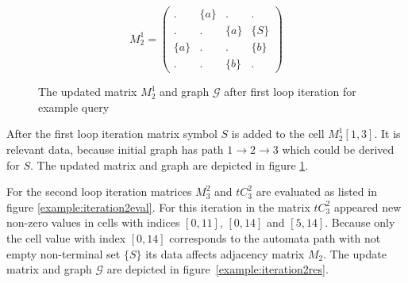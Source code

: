 \begin{figure}[h]
    \begin{subfigure}[]{0.5\textwidth}
    \centering
    $$
    M_2^1 =
    \begin{pmatrix}
    . & \{a\} & . & .     \\
    . & . & \{a\} & \{S\} \\
    \{a\} & . & . & \{b\} \\
    . & . & \{b\} & . 
    \end{pmatrix}
    $$
    \end{subfigure}
    \begin{subfigure}[]{0.4\textwidth}
    \centering
    \end{subfigure}
    \caption{The updated matrix $M_2^1$ and graph $\mathcal{G}$ after first loop iteration for example query}
    \label{example:iteration1res}
\end{figure}

After the first loop iteration matrix symbol $S$ is added to the cell $M_2^1[1,3]$. It is relevant data, because initial graph has path $1 \to 2 \to 3$ which could be derived for $S$. The updated matrix and graph are depicted in figure \ref{example:iteration1res}.

For the second loop iteration matrices $M_3^2$ and $tC_3^2$ are evaluated as listed in figure \ref{example:iteration2eval}. For this iteration in the matrix $tC_3^2$ appeared new non-zero values in cells with indices $[0,11]$, $[0,14]$ and $[5,14]$. Because only the cell value with index $[0,14]$ corresponds to the automata path with not empty non-terminal set $\{S\}$
its data affects adjacency matrix $M_2$. The update matrix and graph $\mathcal{G}$ are depicted in figure~\ref{example:iteration2res}. 

